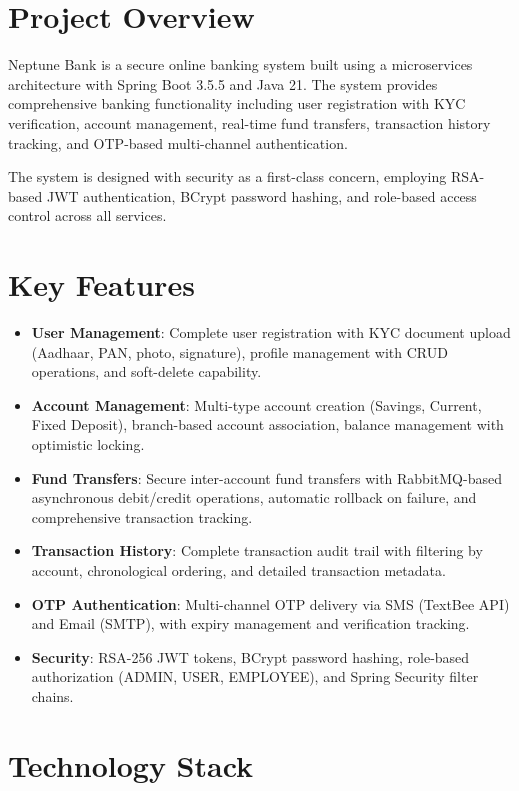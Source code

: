 \documentclass[12pt,a4paper]{report}
\begin{document}
\section{Project Overview}
Neptune Bank is a secure online banking system built using a microservices architecture with Spring Boot 3.5.5 and Java 21. The system provides comprehensive banking functionality including user registration with KYC verification, account management, real-time fund transfers, transaction history tracking, and OTP-based multi-channel authentication.

The system is designed with security as a first-class concern, employing RSA-based JWT authentication, BCrypt password hashing, and role-based access control across all services.

\section{Key Features}
\begin{itemize}[leftmargin=*]
    \item \textbf{User Management}: Complete user registration with KYC document upload (Aadhaar, PAN, photo, signature), profile management with CRUD operations, and soft-delete capability.
    \item \textbf{Account Management}: Multi-type account creation (Savings, Current, Fixed Deposit), branch-based account association, balance management with optimistic locking.
    \item \textbf{Fund Transfers}: Secure inter-account fund transfers with RabbitMQ-based asynchronous debit/credit operations, automatic rollback on failure, and comprehensive transaction tracking.
    \item \textbf{Transaction History}: Complete transaction audit trail with filtering by account, chronological ordering, and detailed transaction metadata.
    \item \textbf{OTP Authentication}: Multi-channel OTP delivery via SMS (TextBee API) and Email (SMTP), with expiry management and verification tracking.
    \item \textbf{Security}: RSA-256 JWT tokens, BCrypt password hashing, role-based authorization (ADMIN, USER, EMPLOYEE), and Spring Security filter chains.
\end{itemize}

\section{Technology Stack}
\end{document}
